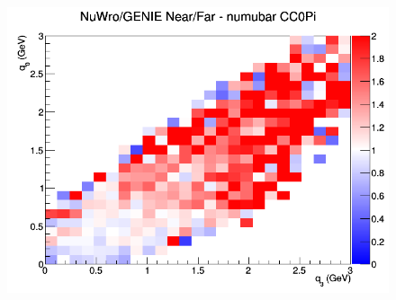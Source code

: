 \begin{figure}[h]
\endminipage
{}
\includegraphics[width=\linewidth]{eff_q0_q3/GAr/ratios/CC0Pi_NuWro_GENIE_numubar_NF_q3_q0.png}
\endminipage
\newline
\end{figure}
\clearpage
